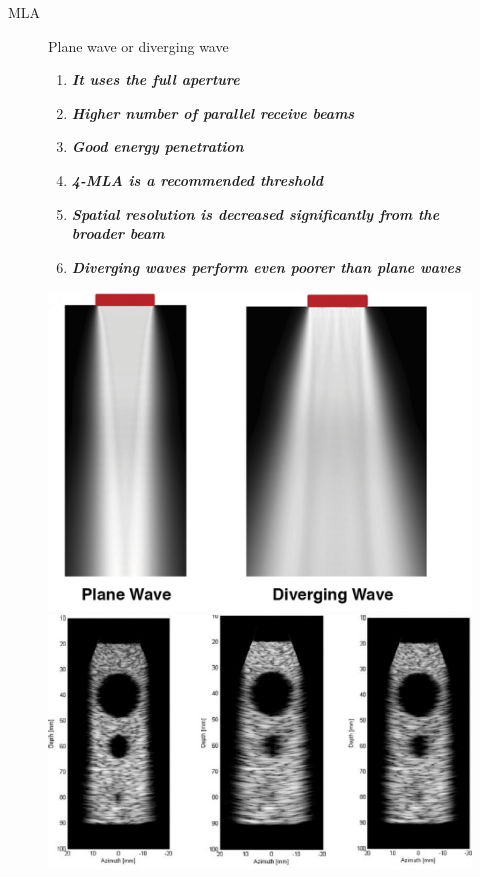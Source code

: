 \documentclass[t,12pt,english
\ifx\beamermode\undefined\else,\beamermode\fi
]{beamer}
\begin{document}
\begin{frame}{MLA  }


\begin{figure}[!htb]


\begin{block}{\footnotesize{\tiny Plane wave or diverging wave \cite{1}}}\tiny{}
\begin{enumerate} 
\vspace{0.05cm}

     \item \tiny{\textbf{\textit{It uses the full aperture}}}
     \item \tiny{\textbf{\textit{Higher number of parallel receive beams}}}
     \item \tiny{\textbf{\textit{Good energy penetration}}}
     \item \tiny{\textbf{\textit{4-MLA is a recommended threshold}}}
     \color{red}
     \item \tiny{\textbf{\textit{Spatial resolution is decreased significantly from the broader beam}}}
     \item \tiny{\textbf{\textit{Diverging waves perform even poorer than plane waves}}}
     
\end{enumerate}
\end{block}
\endminipage
{}
\centering
\includegraphics[width=.7\textwidth]{platewave.jpg}\\
\includegraphics[width=.7\textwidth]{MLAresults1.jpg}\\
\endminipage
\end{figure}


\end{frame}
\end{document}
